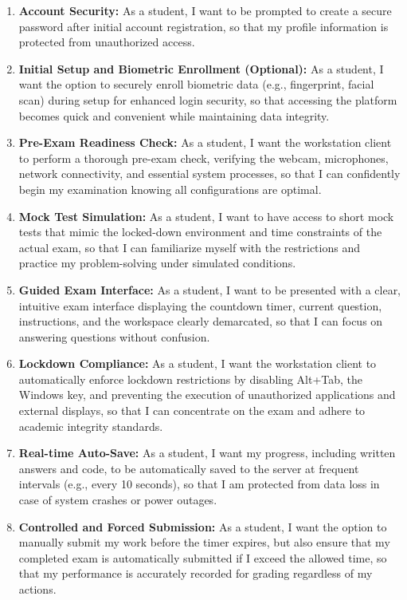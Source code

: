 \begin{enumerate}
    \item \textbf{Account Security:} As a student, I want to be prompted to create a secure password after initial account registration, so that my profile information is protected from unauthorized access.
    \item \textbf{Initial Setup and Biometric Enrollment (Optional):} As a student, I want the option to securely enroll biometric data (e.g., fingerprint, facial scan) during setup for enhanced login security, so that accessing the platform becomes quick and convenient while maintaining data integrity.
    \item \textbf{Pre-Exam Readiness Check:} As a student, I want the workstation client to perform a thorough pre-exam check, verifying the webcam, microphones, network connectivity, and essential system processes, so that I can confidently begin my examination knowing all configurations are optimal.
    \item \textbf{Mock Test Simulation:} As a student, I want to have access to short mock tests that mimic the locked-down environment and time constraints of the actual exam, so that I can familiarize myself with the restrictions and practice my problem-solving under simulated conditions.
    \item \textbf{Guided Exam Interface:} As a student, I want to be presented with a clear, intuitive exam interface displaying the countdown timer, current question, instructions, and the workspace clearly demarcated, so that I can focus on answering questions without confusion.
    \item \textbf{Lockdown Compliance:} As a student, I want the workstation client to automatically enforce lockdown restrictions by disabling Alt+Tab, the Windows key, and preventing the execution of unauthorized applications and external displays, so that I can concentrate on the exam and adhere to academic integrity standards.
    \item \textbf{Real-time Auto-Save:} As a student, I want my progress, including written answers and code, to be automatically saved to the server at frequent intervals (e.g., every 10 seconds), so that I am protected from data loss in case of system crashes or power outages.
    \item \textbf{Controlled and Forced Submission:} As a student, I want the option to manually submit my work before the timer expires, but also ensure that my completed exam is automatically submitted if I exceed the allowed time, so that my performance is accurately recorded for grading regardless of my actions.
\end{enumerate}

